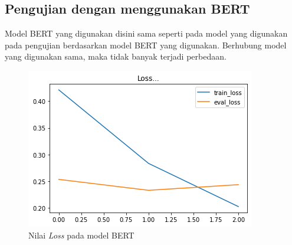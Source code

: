 \subsection{Pengujian dengan menggunakan BERT}

Model BERT yang digunakan disini sama seperti pada model yang digunakan pada pengujian berdasarkan model BERT yang digunakan. Berhubung model yang digunakan sama, maka tidak banyak terjadi perbedaan.

\begin{figure}[h]
    \begin{center}
        \includegraphics[width= 0.9\linewidth]{gambar/loss_cahya_bert_522.png}
        \caption{Nilai \textit{Loss} pada model BERT}
        \label{fig: loss_bert}
    \end{center}
\end{figure}

